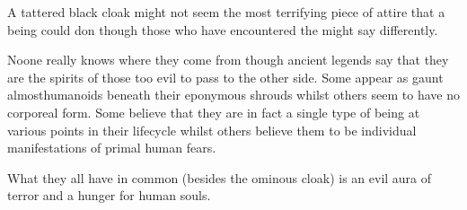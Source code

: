 {
	A tattered black cloak might not seem the most terrifying piece of attire that a being could don\comma{} though those who have encountered the  might say differently. 

No\minus{}one really knows where they come from\comma{} though ancient legends say that they are the spirits of those too evil to pass to the other side. Some  appear as gaunt almost\minus{}humanoids beneath their eponymous shrouds\comma{} whilst others seem to have no corporeal form. Some believe that they are in fact a single type of being at various points in their lifecycle\comma{} whilst others believe them to be individual manifestations of primal human fears.

What they all have in common (besides the ominous cloak)\comma{} is an evil aura of terror\comma{} and a hunger for human souls.
}
